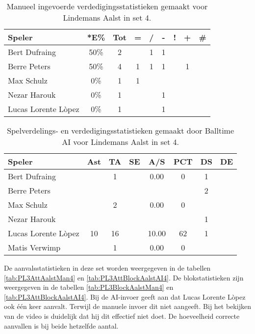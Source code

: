 \begin{table}[ht!]
    \centering
    \scriptsize
    \begin{tabular}{|l|c|c|c|c|c|c|c|c|}
        \hline
        \textbf{Speler} & *E\% & Tot & = & / & - & ! & + & \# \\ \hline
        Bert Dufraing & 50\% & 2 &  & 1 & 1 &  &  & \\ 
        Berre Peters & 50\% & 4 & 1 & 1 & 1 & & 1 &  \\ 
        Max Schulz & 0\% & 1 & 1 &  &  &  &  & \\ 
        Nezar Harouk & 0\% & 1 &  &  & 1 &  &  &  \\ 
        Lucas Lorente Lòpez & 0\% & 1 &  &  & 1 &  &  & \\ \hline
    \end{tabular}
    \caption[Manueel ingevoerde verdedigingsstatistieken gemaakt voor Lindemans Aalst in set 4]{\label{tab:PL3DigAalstMan4}Manueel ingevoerde verdedigingsstatistieken gemaakt voor Lindemans Aalst in set 4.}
\end{table}

\begin{table}[ht!]
  \centering
  \scriptsize
  \begin{tabular}{|l|c|c|c|c|c|c|c|} \hline
    \textbf{Speler} & Ast & TA & SE & A/S & PCT & DS &  DE \\ \hline
    Bert Dufraing &  & 1 &  & 0.00 & 0 & 1 &  \\
    Berre Peters &   &   &   &   &   & 2 &   \\
    Max Schulz &  & 2 &  & 0.00 & 0 &   &   \\
    Nezar Harouk &   &   &   &   &   &  1 &   \\
    Lucas Lorente Lòpez & 10 & 16 &  & 10.00 & 62 & 1 &  \\
    Matis Verwimp &  & 1 &  & 0.00 & 0 &   &   \\ \hline
  \end{tabular}
 \caption[Spelverdelings- en verdedigingsstatistieken gemaakt door Balltime AI voor Lindemans Aalst in set 4]{\label{tab:PL3SetDigAalstAI4}Spelverdelings- en verdedigingsstatistieken gemaakt door Balltime AI voor Lindemans Aalst in set 4.}
\end{table}

De aanvalsstatistieken in deze set worden weergegeven in de tabellen \ref{tab:PL3AttAalstMan4} en \ref{tab:PL3AttBlockAalstAI4}. De blokstatistieken zijn weergegeven in de tabellen \ref{tab:PL3BlockAalstMan4} en \ref{tab:PL3AttBlockAalstAI4}. Bij de AI-invoer geeft aan dat Lucas Lorente Lòpez ook één keer aanvalt. Terwijl de manuele invoer dit niet aangeeft. Bij het bekijken van de video is duidelijk dat hij dit effectief niet doet. De hoeveelheid correcte aanvallen is bij beide hetzelfde aantal.

